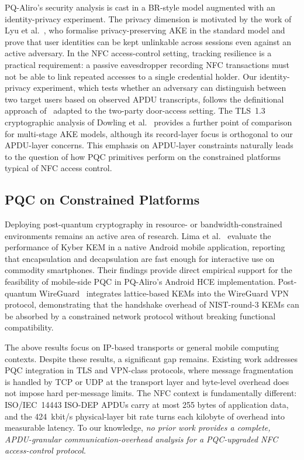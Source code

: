 PQ-Aliro's security analysis is cast in a BR-style model augmented with an
identity-privacy experiment.
The privacy dimension is motivated by the work of Lyu et al.~\cite{AC:LLHG22},
who formalise privacy-preserving AKE in the standard model and prove that user
identities can be kept unlinkable across sessions even against an active
adversary.
In the NFC access-control setting, tracking resilience is a practical
requirement: a passive eavesdropper recording NFC transactions must not be able
to link repeated accesses to a single credential holder.
Our identity-privacy experiment, which tests whether an adversary can
distinguish between two target users based on observed APDU transcripts,
follows the definitional approach of~\cite{AC:LLHG22} adapted to the two-party
door-access setting.
The TLS~1.3 cryptographic analysis of Dowling et al.~\cite{JC:DFGS21} provides
a further point of comparison for multi-stage AKE models, although its
record-layer focus is orthogonal to our APDU-layer concerns.
This emphasis on APDU-layer constraints naturally leads to the question of how
PQC primitives perform on the constrained platforms typical of NFC access
control.

\subsection{PQC on Constrained Platforms}
\label{sec:related:constrained}

Deploying post-quantum cryptography in resource- or bandwidth-constrained
environments remains an active area of research.
Lima et al.~\cite{NIST3PQC:Lima21} evaluate the performance of Kyber KEM in a
native Android mobile application, reporting that encapsulation and
decapsulation are fast enough for interactive use on commodity smartphones.
Their findings provide direct empirical support for the feasibility of
mobile-side PQC in PQ-Aliro's Android HCE implementation.
Post-quantum WireGuard~\cite{SP:HNSWZ21} integrates lattice-based KEMs into the
WireGuard VPN protocol, demonstrating that the handshake overhead of
NIST-round-3 KEMs can be absorbed by a constrained network protocol without
breaking functional compatibility.

The above results focus on IP-based transports or general mobile computing
contexts.
Despite these results, a significant gap remains.
Existing work addresses PQC integration in TLS and VPN-class protocols, where
message fragmentation is handled by TCP or UDP at the transport layer and
byte-level overhead does not impose hard per-message limits.
The NFC context is fundamentally different: ISO/IEC~14443 ISO-DEP APDUs carry
at most 255 bytes of application data, and the 424~kbit/s physical-layer
bit rate turns each kilobyte of overhead into measurable latency.
To our knowledge, \emph{no prior work provides a complete, APDU-granular
communication-overhead analysis for a PQC-upgraded NFC access-control
protocol}.

